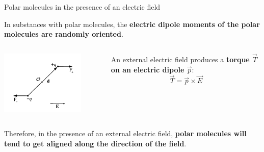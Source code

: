 %
%
%

\begin{frame}{Polar molecules in the presence of an electric field}

In substances with polar molecules, the {\bf electric dipole moments
of the polar molecules are randomly oriented}.\\

\vspace{0.3cm}

\begin{columns}
  \begin{column}{0.40\textwidth}
   \begin{center}
     \includegraphics[width=0.80\textwidth]{./images/schematics/electric_dipole_torque_0.png}\\
   \end{center}
  \end{column}
  \begin{column}{0.60\textwidth}
      An external electric field produces a {\bf torque $\vec{T}$ on
      an electric dipole $\vec{p}$}:
      \begin{equation*}
          \vec{T} = \vec{p} \times \vec{E}
      \end{equation*}
  \end{column}
\end{columns}

\vspace{0.3cm}

Therefore, in the presence of an external electric field,
{\bf polar molecules will tend to get aligned along the direction of the field}.

\end{frame}

%
%
%


